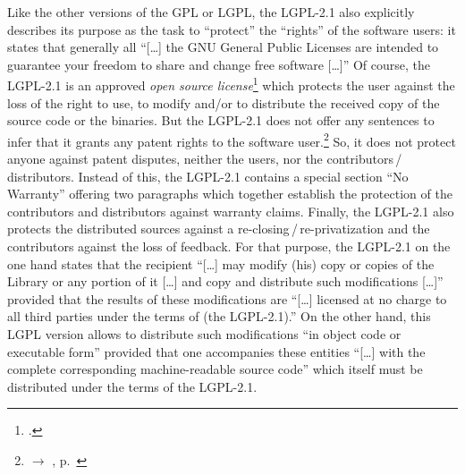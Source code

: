 Like the other versions of the GPL or LGPL, the LGPL-2.1 also explicitly
describes its purpose as the task to \enquote{protect} the \enquote{rights} of
the software users: it states that generally all \enquote{[\ldots] the GNU
General Public Licenses are intended to guarantee your freedom to share and
change free software [\ldots]} Of course, the LGPL-2.1 is
an approved \emph{open source license}\footcite[cf.][\nopage wp]{OSI2012b} which
protects the user against the loss of the right to use, to modify and/or to
distribute the received copy of the source code or the binaries. 
But the LGPL-2.1 does not offer any sentences to infer that it grants any patent
rights to the software user.\footnote{$\rightarrow$ \oslic,
p.\ } So, it does not protect anyone against
patent disputes, neither the users, nor the
contributors\,/\,distributors. Instead of this, the LGPL-2.1 contains a special 
section \enquote{No Warranty} offering two paragraphs which together establish
the protection of the contributors and distributors against warranty
claims. Finally, the LGPL-2.1 also protects the
distributed sources against a re-closing\,/\,re-privatization and the
contributors against the loss of feedback. For that purpose, the LGPL-2.1 on the
one hand states that the recipient \enquote{[\ldots] may modify (his) copy or
copies of the Library or any portion of it [\ldots] and copy and distribute such
modifications [\ldots]} provided that the results of these modifications are
\enquote{[\ldots] licensed at no charge to all third parties under the terms of
(the LGPL-2.1).} On the other hand, this LGPL version allows to
distribute such modifications \enquote{in object code or executable form}
provided that one accompanies these entities \enquote{[\ldots] with the complete
corresponding machine-readable source code} which itself must be distributed
under the terms of the LGPL-2.1.


